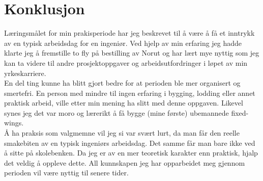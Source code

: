 \documentclass[12pt, a4paper]{report}
\begin{document}
\section{Konklusjon}
Læringsmålet for min prakisperiode har jeg beskrevet til å være å få et inntrykk av en typisk arbeidsdag for en ingeniør. Ved hjelp av min erfaring jeg hadde klarte jeg å fremstille to fly på bestilling av Norut og har lært mye nyttig som jeg kan ta videre til andre prosjektoppgaver og arbeidsutfordringer i løpet av min yrkeskarriere. \\
En del ting kunne ha blitt gjort bedre for at perioden ble mer organisert og smertefri. En person med mindre til ingen erfaring i bygging, lodding eller annet praktisk arbeid, ville etter min mening ha slitt med denne oppgaven. Likevel synes jeg det var moro og lærerikt å få bygge (mine første) ubemannede fixed-wings. \\
Å ha praksis som valgmemne vil jeg si var svært lurt, da man får den reelle smakebiten av en typisk ingeniørs arbeidsdag. Det samme får man bare ikke ved å sitte på skolebenken. Da jeg er av en mer teoretisk karakter enn praktisk, hjalp det veldig å oppleve dette. All kunnskapen jeg har opparbeidet meg gjennom perioden vil være nyttig til senere tider. 

\end{document}

